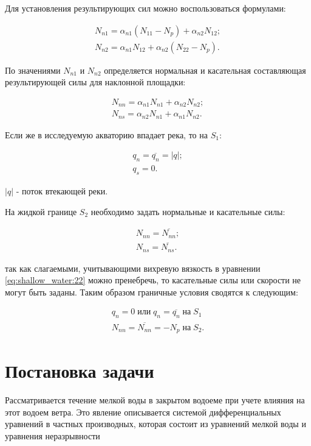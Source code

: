 \documentclass[14pt]{extreport}
\begin{document}
Для установления результирующих сил можно воспользоваться формулами:

\begin{eqnarray}
N_{n1}=\alpha_{n1}(N_{11}-N_{p})+\alpha_{n2}N_{12}; \nonumber\\
N_{n2}=\alpha_{n1}N_{12}+\alpha_{n2}(N_{22}-N_{p}).
\end{eqnarray}

По значениями $N_{n1}$ и $N_{n2}$ определяется нормальная и касательная составляющая результирующей силы для наклонной площадки:

\begin{eqnarray}
N_{nn}=\alpha_{n1}N_{n1}+\alpha_{n2}N_{n2}; \nonumber\\
N_{ns}=\alpha_{n2}N_{n1}+\alpha_{n1}N_{n2}.
\end{eqnarray}

Если же в исследуемую акваторию впадает река, то на $ S_1 $:

\begin{eqnarray}
q_n=\overline{q_n}=|q|; \nonumber\\
q_s=0.
\end{eqnarray}

 $|q|$ - поток втекающей
реки. 

На жидкой границе $ S_2 $ необходимо задать нормальные и касательные силы:

\begin{eqnarray}
N_{nn}=\overline{N_{nn}}; \nonumber\\
N_{ns}=\overline{N_{ns}}.
\end{eqnarray}

 так как слагаемыми, учитывающими вихревую вязкость в уравнении \ref{eq:shallow_water:22} можно пренебречь, то касательные силы или скорости не могут быть заданы. Таким образом граничные условия сводятся к следующим:

\begin{eqnarray}
q_n=0 \; \text{или} \; q_n=\overline{q_n} \; \text{на} \; S_1\nonumber\\
N_{nn}=\overline{N_{nn}}=-N_p \; \text{на} \; S_2.
\end{eqnarray}

\chapter{Постановка задачи}

Рассматривается течение мелкой воды в закрытом водоеме при учете влияния на этот водоем ветра. Это явление описывается системой дифференциальных уравнений в частных производных, которая состоит из уравнений мелкой воды и уравнения неразрывности
\end{document}
